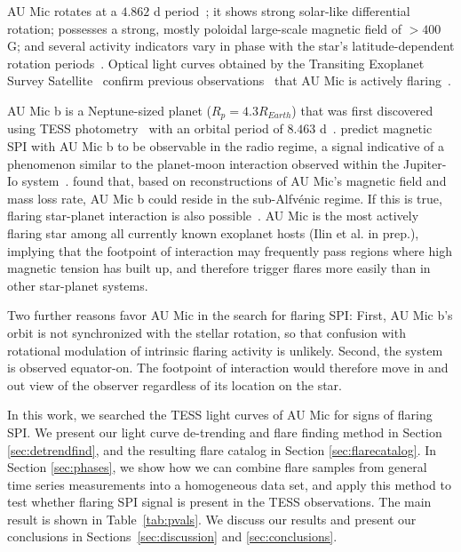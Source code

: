 \documentclass[fleqn,usenatbib]{mnras}%
\begin{document}
AU Mic rotates at a $4.862$ d period~\citep{plavchan2020}; it shows strong solar-like differential rotation; possesses a strong, mostly poloidal large-scale magnetic field of $>400$ G; and several activity indicators vary in phase with the star's latitude-dependent rotation periods~\citep{klein2021}. Optical light curves obtained by the Transiting Exoplanet Survey Satellite~\citep[TESS,][]{ricker2014} confirm previous observations~\citep{katsova1999, robinson2001, redfield2002} that AU Mic is actively flaring~\citep{martioli2021new}.

AU Mic b is a Neptune-sized planet ($R_p = 4.3R_{Earth}$) that was first discovered using TESS photometry~\citep{plavchan2020} with an orbital period of $8.463$ d~\citep{plavchan2020,martioli2021new}. 
\citet{kavanagh2021} predict magnetic SPI with AU Mic b to be observable in the radio regime, a signal indicative of a phenomenon similar to the planet-moon interaction observed within the Jupiter-Io system~\citep{saur2013magnetic}. \citet{kavanagh2021} found that, based on reconstructions of AU Mic's magnetic field and mass loss rate, AU Mic b could reside in the sub-Alfv\'enic regime. If this is true, flaring star-planet interaction is also possible~\citep{lanza2018close-by}. AU Mic is the most actively flaring star among all currently known exoplanet hosts (Ilin et al. in prep.), implying that the footpoint of interaction may frequently pass regions where high magnetic tension has built up, and therefore trigger flares more easily than in other star-planet systems. 

Two further reasons favor AU Mic in the search for flaring SPI: First, AU Mic b's orbit is not synchronized with the stellar rotation, so that confusion with rotational modulation of intrinsic flaring activity is unlikely. Second, the system is observed equator-on. The footpoint of interaction would therefore move in and out view of the observer regardless of its location on the star.%

In this work, we searched the TESS light curves of AU Mic for signs of flaring SPI. We present our light curve de-trending and flare finding method in Section \ref{sec:detrendfind}, and the resulting flare catalog in Section \ref{sec:flarecatalog}. In Section \ref{sec:phases}, we show how we can combine flare samples from general time series measurements into a homogeneous data set, and apply this method to test whether flaring SPI signal is present in the TESS observations. The main result is shown in Table~\ref{tab:pvals}. We discuss our results and present our conclusions in Sections~\ref{sec:discussion} and \ref{sec:conclusions}.
\end{document}
